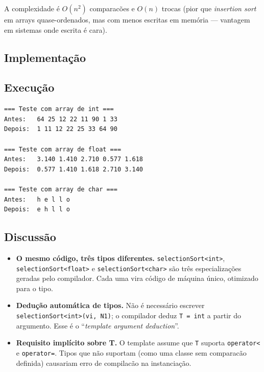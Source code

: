\documentclass[11pt,a4paper]{article}
\begin{document}
A complexidade \'e $O(n^2)$ comparac\~oes e $O(n)$ trocas (pior que \emph{insertion sort} em arrays quase-ordenados, mas com menos escritas em mem\'oria --- vantagem em sistemas onde escrita \'e cara).

\subsection*{Implementa\c{c}\~ao}



\subsection*{Execu\c{c}\~ao}

\begin{saidabox}
\begin{lstlisting}[style=terminal]
=== Teste com array de int ===
Antes:   64 25 12 22 11 90 1 33
Depois:  1 11 12 22 25 33 64 90

=== Teste com array de float ===
Antes:   3.140 1.410 2.710 0.577 1.618
Depois:  0.577 1.410 1.618 2.710 3.140

=== Teste com array de char ===
Antes:   h e l l o
Depois:  e h l l o
\end{lstlisting}
\end{saidabox}\normalcolor

\subsection*{Discuss\~ao}

\begin{itemize}[leftmargin=*]
  \item \textbf{O mesmo c\'odigo, tr\^es tipos diferentes.} \texttt{selectionSort<int>}, \texttt{selectionSort<float>} e \texttt{selectionSort<char>} s\~ao tr\^es especializa\c{c}\~oes geradas pelo compilador. Cada uma vira c\'odigo de m\'aquina \'unico, otimizado para o tipo.
  \item \textbf{Dedu\c{c}\~ao autom\'atica de tipos.} N\~ao \'e necess\'ario escrever \texttt{selectionSort<int>(vi, N1)}; o compilador deduz \texttt{T = int} a partir do argumento. Esse \'e o ``\emph{template argument deduction}''.
  \item \textbf{Requisito impl\'icito sobre T.} O template assume que \texttt{T} suporta \texttt{operator<} e \texttt{operator=}. Tipos que n\~ao suportam (como uma classe sem comparac\~ao definida) causariam erro de compilac\~ao na instancia\c{c}\~ao.
\end{itemize}
\end{document}
